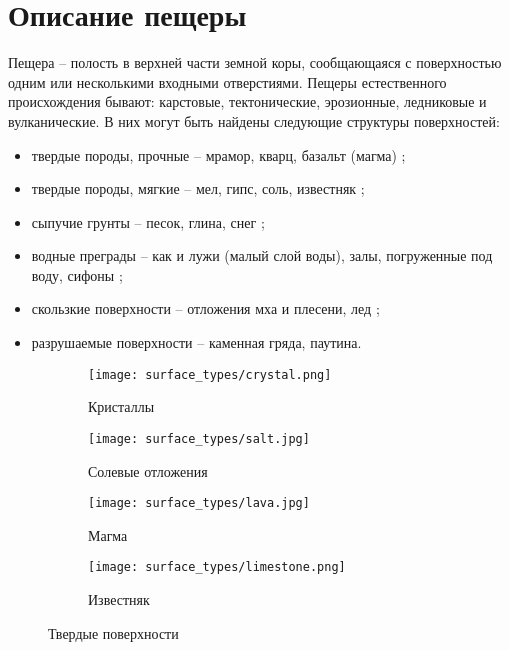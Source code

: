 \section{Описание пещеры}
Пещера -- полость в верхней части земной коры, сообщающаяся с поверхностью одним или несколькими входными отверстиями. Пещеры естественного происхождения бывают: карстовые, тектонические, эрозионные, ледниковые и вулканические. В них могут быть найдены следующие структуры поверхностей:
\begin{itemize}
    \item твердые породы, прочные -- мрамор, кварц, базальт (магма) ;
    \item твердые породы, мягкие -- мел, гипс, соль, известняк ;
    \item сыпучие грунты -- песок, глина, снег ;
    \item водные преграды -- как и лужи (малый слой воды), залы, погруженные под воду, сифоны ;
    \item скользкие поверхности -- отложения мха и плесени, лед ;
    \item разрушаемые поверхности -- каменная гряда, паутина.
\end{itemize}


\begin{figure}[H]
\begin{subfigure}{0.49\textwidth}
\texttt{[image: surface\_types/crystal.png]}\\
\caption{Кристаллы}
\label{fig:crystal}
\end{subfigure}
\begin{subfigure}{0.49\textwidth}
\texttt{[image: surface\_types/salt.jpg]}\\
\caption{Солевые отложения}
\label{fig:salt}
\end{subfigure}

\begin{subfigure}{0.49\textwidth}
\texttt{[image: surface\_types/lava.jpg]}\\
\caption{Магма}
\label{fig:lava}
\end{subfigure}
\begin{subfigure}{0.49\textwidth}
\texttt{[image: surface\_types/limestone.png]}\\
\caption{Известняк}
\label{fig:limestone}
\end{subfigure}
\caption{Твердые поверхности}
\label{fig:solid_surfaces}
\end{figure}

